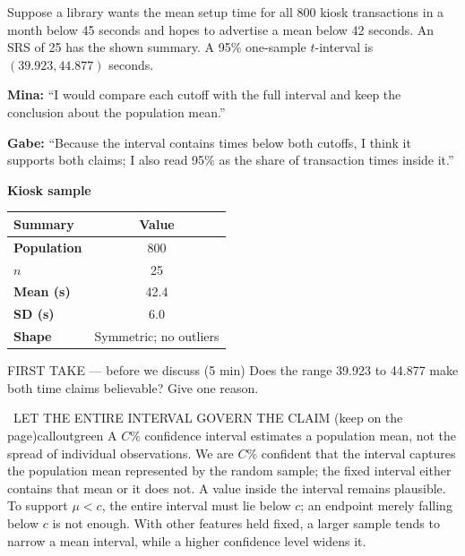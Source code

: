 \documentclass[11pt]{article}
\begin{document}


Suppose a library wants the mean setup time for all 800 kiosk transactions in a month below 45 seconds and hopes to advertise a mean below 42 seconds. An SRS of 25 has the shown summary. A 95\% one-sample $t$-interval is $(39.923,44.877)$ seconds.\par\smallskip \textbf{Mina:} ``I would compare each cutoff with the full interval and keep the conclusion about the population mean.''\par \textbf{Gabe:} ``Because the interval contains times below both cutoffs, I think it supports both claims; I also read 95\% as the share of transaction times inside it.''\par
\begin{center}
\textbf{Kiosk sample}\par\smallskip
\begin{tabular}{|l|c|}
\hline
\textbf{Summary} & \textbf{Value} \\ \hline
\textbf{Population} & 800 \\ \hline
\textbf{$n$} & 25 \\ \hline
\textbf{Mean (s)} & 42.4 \\ \hline
\textbf{SD (s)} & 6.0 \\ \hline
\textbf{Shape} & Symmetric; no outliers \\ \hline
\end{tabular}
\end{center}
\begin{firsttakebox}{FIRST TAKE --- before we discuss (5 min)}
Does the range 39.923 to 44.877 make both time claims believable? Give one reason.
\workspace{0.9in}
\end{firsttakebox}

\begin{callout}{\IconBook\ LET THE ENTIRE INTERVAL GOVERN THE CLAIM (keep on the page)}{calloutgreen}
A $C\%$ confidence interval estimates a population mean, not the spread of individual observations.
We are $C\%$ confident that the interval captures the population mean represented by the random sample;
the fixed interval either contains that mean or it does not. A value inside the interval remains plausible.
To support $\mu<c$, the entire interval must lie below $c$; an endpoint merely falling below $c$ is not enough.
With other features held fixed, a larger sample tends to narrow a mean interval, while a higher confidence
level widens it.
\end{callout}
\end{document}
